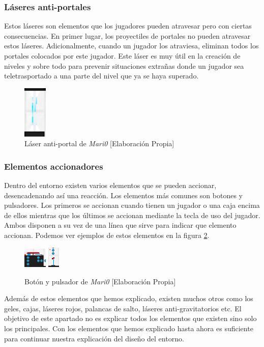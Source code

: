 \subsubsection*{Láseres anti-portales}

Estos láseres son elementos que los jugadores pueden atravesar pero con ciertas consecuencias. En primer lugar, los proyectiles de portales no pueden atravesar estos láseres. Adicionalmente, cuando un jugador los atraviesa, eliminan todos los portales colocados por este jugador. Este láser es muy útil en la creación de niveles y sobre todo para prevenir situaciones extrañas donde un jugador sea teletrasportado a una parte del nivel que ya se haya superado.
\begin{figure}[h]
    \centering
    \includegraphics[width=0.1\textwidth]{img/laser-antiportal.png}
    \caption{Láser anti-portal de \textit{Mari0} [Elaboración Propia]}
    \label{fig:antiportal}
\end{figure}

\subsubsection*{Elementos accionadores}

Dentro del entorno existen varios elementos que se pueden accionar, desencadenando así una reacción. Los elementos más comunes son botones y pulsadores. Los primeros se accionan cuando tienen un jugador o una caja encima de ellos mientras que los últimos se accionan mediante la tecla de uso del jugador. Ambos disponen a su vez de una línea que sirve para indicar que elemento accionan. Podemos ver ejemplos de estos elementos en la figura \ref {fig:boton}.
\begin{figure}[h]
    \centering
    \includegraphics[width=0.1\textwidth]{img/boton.png}
    \includegraphics[width=0.05\textwidth]{img/pulsador.png}
    \caption{Botón y pulsador de \textit{Mari0} [Elaboración Propia]}
    \label{fig:boton}
\end{figure}

Además de estos elementos que hemos explicado, existen muchos otros como los geles, cajas, láseres rojos, palancas de salto, láseres anti-gravitatorios etc. El objetivo de este apartado no es explicar todos los elementos que existen sino solo los principales. Con los elementos que hemos explicado hasta ahora es suficiente para continuar nuestra explicación del diseño del entorno. 

